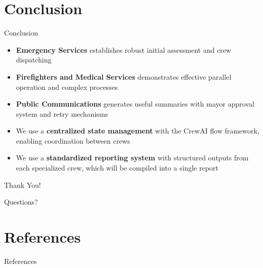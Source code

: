 \documentclass{beamer}
\begin{document}
\section{Conclusion}
\begin{frame}{Conclusion}
    \begin{itemize}
        \item \textbf{Emergency Services} establishes robust initial assessment and crew dispatching
        \item \textbf{Firefighters and Medical Services} demonstrates effective parallel operation and complex processes
        \item \textbf{Public Communications} generates useful summaries with mayor approval system and retry mechanisms
        \item We use a \textbf{centralized state management} with the CrewAI flow framework, enabling coordination between crews
        \item We use a \textbf{standardized reporting system} with structured outputs from each specialized crew, which will be compiled into a single report
    \end{itemize}
\end{frame}

\begin{frame}
    \centering
    \vspace{2cm}
    {\Large Thank You!}
    \vspace{1cm}
    
    {\large Questions?}
\end{frame}


\section{References}
\begin{frame}{References}
    \nocite{*}
    
\end{frame}
\end{document}

